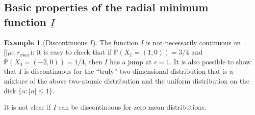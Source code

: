 \documentclass[10pt]{amsart}
\theoremstyle{definition}\newtheorem{defi}[theo]{Definition}\newtheorem{rema}[theo]{Remark}\newtheorem{exam}[theo]{Example}\newtheorem{exem}[theo]{Example}\newtheorem{nota}[theo]{Notation}
\newcommand{\ubar}[1]{\underline{#1}}
\newcommand{\Pbb}{\mathbb{P}}
\begin{document}
\subsection{Basic properties of the radial minimum function \texorpdfstring{$\ubar I$}{ubar I}} \label{Sec: Basic Proof}

\begin{exam}[{Discontinuous $\ubar I$}]\label{ex: I_ discontinuous}
The function $\ubar I$ is not necessarily continuous on $[|\mu|, r_{max})$: it is easy to check that if $\Pbb(X_1=(1,0))=3/4$ and $\Pbb(X_1=(-2,0))=1/4$, then $\ubar I$ has a jump at $r=1$. It is also possible to show that $\ubar I$ is discontinuous for the ``truly'' two-dimensional distribution that is a mixture of the above two-atomic distribution and the uniform distribution on the disk $\{u: |u| \le 1\}$.

It is not clear if $\ubar I$ can be discontinuous for zero mean distributions.
\end{exam}
\end{document}
